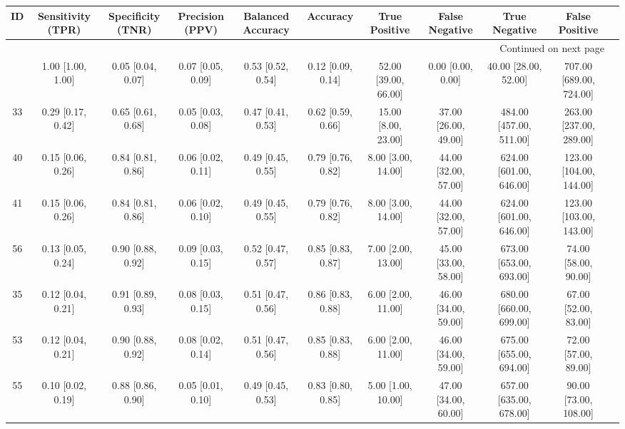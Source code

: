 \documentclass[8pt]{article}
\begin{document}
\begin{center}
\begin{footnotesize}
\begin{longtable}{|ccccccccccc|}
\toprule
 ID &  Sensitivity (TPR) &  Specificity (TNR) &    Precision (PPV) &  Balanced Accuracy &           Accuracy &         True Positive &        False Negative &            True Negative &           False Positive \\
\midrule
\endhead
\midrule
\multicolumn{10}{r}{{Continued on next page}} \\
\midrule
\endfoot

\bottomrule
\endlastfoot
 42 &  1.00 [1.00, 1.00] &  0.05 [0.04, 0.07] &  0.07 [0.05, 0.09] &  0.53 [0.52, 0.54] &  0.12 [0.09, 0.14] &  52.00 [39.00, 66.00] &     0.00 [0.00, 0.00] &     40.00 [28.00, 52.00] &  707.00 [689.00, 724.00] \\
 33 &  0.29 [0.17, 0.42] &  0.65 [0.61, 0.68] &  0.05 [0.03, 0.08] &  0.47 [0.41, 0.53] &  0.62 [0.59, 0.66] &   15.00 [8.00, 23.00] &  37.00 [26.00, 49.00] &  484.00 [457.00, 511.00] &  263.00 [237.00, 289.00] \\
 40 &  0.15 [0.06, 0.26] &  0.84 [0.81, 0.86] &  0.06 [0.02, 0.11] &  0.49 [0.45, 0.55] &  0.79 [0.76, 0.82] &    8.00 [3.00, 14.00] &  44.00 [32.00, 57.00] &  624.00 [601.00, 646.00] &  123.00 [104.00, 144.00] \\
 41 &  0.15 [0.06, 0.26] &  0.84 [0.81, 0.86] &  0.06 [0.02, 0.10] &  0.49 [0.45, 0.55] &  0.79 [0.76, 0.82] &    8.00 [3.00, 14.00] &  44.00 [32.00, 57.00] &  624.00 [601.00, 646.00] &  123.00 [103.00, 143.00] \\
 56 &  0.13 [0.05, 0.24] &  0.90 [0.88, 0.92] &  0.09 [0.03, 0.15] &  0.52 [0.47, 0.57] &  0.85 [0.83, 0.87] &    7.00 [2.00, 13.00] &  45.00 [33.00, 58.00] &  673.00 [653.00, 693.00] &     74.00 [58.00, 90.00] \\
 35 &  0.12 [0.04, 0.21] &  0.91 [0.89, 0.93] &  0.08 [0.03, 0.15] &  0.51 [0.47, 0.56] &  0.86 [0.83, 0.88] &    6.00 [2.00, 11.00] &  46.00 [34.00, 59.00] &  680.00 [660.00, 699.00] &     67.00 [52.00, 83.00] \\
 53 &  0.12 [0.04, 0.21] &  0.90 [0.88, 0.92] &  0.08 [0.02, 0.14] &  0.51 [0.47, 0.56] &  0.85 [0.83, 0.88] &    6.00 [2.00, 11.00] &  46.00 [34.00, 59.00] &  675.00 [655.00, 694.00] &     72.00 [57.00, 89.00] \\
 55 &  0.10 [0.02, 0.19] &  0.88 [0.86, 0.90] &  0.05 [0.01, 0.10] &  0.49 [0.45, 0.53] &  0.83 [0.80, 0.85] &    5.00 [1.00, 10.00] &  47.00 [34.00, 60.00] &  657.00 [635.00, 678.00] &    90.00 [73.00, 108.00] \\

\end{longtable}
\end{footnotesize}
\end{center}
\end{document}
